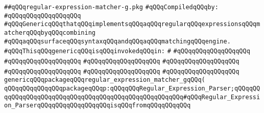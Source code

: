 \label{src/lib/regex/glue/regular-expression-matcher-g.pkg}
\verb|##qQQqregular-expression-matcher-g.pkg|\newline
\newline
\verb|#qQQqCompiledqQQqby:|\newline
\verb|#qQQqqQQqqQQqqQQqqQQq|\newline
\newline
\verb|#qQQqGenericqQQqthatqQQqimplementsqQQqaqQQqregularqQQqexpressionsqQQqmatcherqQQqbyqQQqcombining|\newline
\verb|#qQQqaqQQqsurfaceqQQqsyntaxqQQqandqQQqaqQQqmatchingqQQqengine.|\newline
\newline
\verb|#qQQqThisqQQqgenericqQQqisqQQqinvokedqQQqin:|\newline
\verb|#|\newline
\verb|#qQQqqQQqqQQqqQQqqQQq|\newline
\verb|#qQQqqQQqqQQqqQQqqQQq|\newline
\verb|#qQQqqQQqqQQqqQQqqQQq|\newline
\verb|#qQQqqQQqqQQqqQQqqQQq|\newline
\verb|#qQQqqQQqqQQqqQQqqQQq|\newline
\verb|#qQQqqQQqqQQqqQQqqQQq|\newline
\verb|#qQQqqQQqqQQqqQQqqQQq|\newline
\newline
\newline
\newline
\verb|genericqQQqpackageqQQqregular_expression_matcher_gqQQq(|\newline
\verb|qQQqqQQqqQQqqQQqpackageqQQqp:qQQqqQQqRegular_Expression_Parser;qQQqqQQqqQQqqQQqqQQqqQQqqQQqqQQqqQQqqQQqqQQqqQQqqQQqqQQq#qQQqRegular_Expression_ParserqQQqqQQqqQQqqQQqqQQqisqQQqfromqQQqqQQqqQQq|\newline
